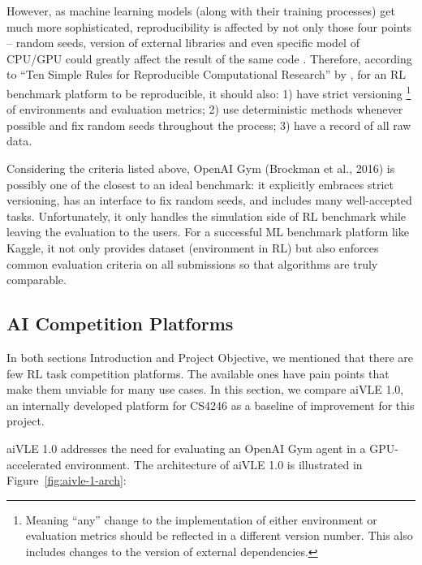 However, as machine learning models (along with their training processes) get much more sophisticated, reproducibility is affected by not only those four points – random seeds, version of external libraries and even specific model of CPU/GPU could greatly affect the result of the same code \cite{RN21}. Therefore, according to “Ten Simple Rules for Reproducible Computational Research” by \cite{RN22}, for an RL benchmark platform to be reproducible, it should also: 1) have strict versioning \footnote{Meaning “any” change to the implementation of either environment or evaluation metrics should be reflected in a different version number. This also includes changes to the version of external dependencies.} of environments and evaluation metrics; 2) use deterministic methods whenever possible and fix random seeds throughout the process; 3) have a record of all raw data.

Considering the criteria listed above, OpenAI Gym (Brockman et al., 2016) is possibly one of the closest to an ideal benchmark: it explicitly embraces strict versioning, has an interface to fix random seeds, and includes many well-accepted tasks. Unfortunately, it only handles the simulation side of RL benchmark while leaving the evaluation to the users. For a successful ML benchmark platform like Kaggle, it not only provides dataset (environment in RL) but also enforces common evaluation criteria on all submissions so that algorithms are truly comparable.

\subsection{AI Competition Platforms}
\label{ch:literature-review-related-work-ai-competition-platforms}
In both sections Introduction and Project Objective, we mentioned that there are few RL task competition platforms. The available ones have pain points that make them unviable for many use cases. In this section, we compare aiVLE 1.0, an internally developed platform for CS4246 as a baseline of improvement for this project.

aiVLE 1.0 addresses the need for evaluating an OpenAI Gym agent in a GPU-accelerated environment. The architecture of aiVLE 1.0 is illustrated in Figure~\ref{fig:aivle-1-arch}:

